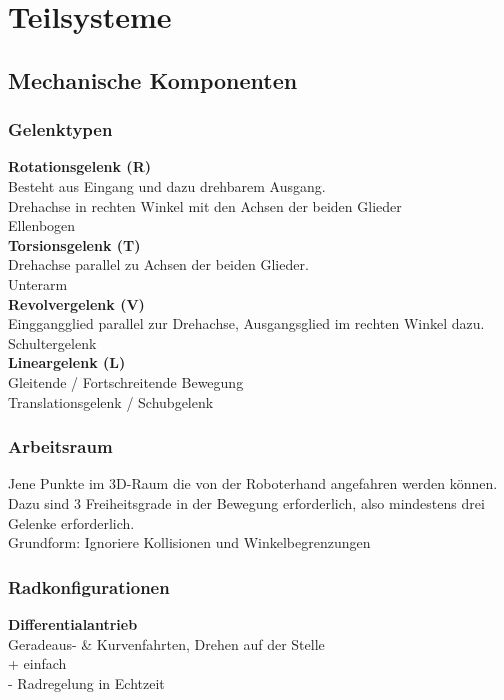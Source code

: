 

\section{Teilsysteme}

\subsection{Mechanische Komponenten}
\subsubsection{Gelenktypen}
\textbf{Rotationsgelenk (R)}\\
Besteht aus Eingang und dazu drehbarem Ausgang.\\
Drehachse in rechten Winkel mit den Achsen der beiden Glieder\\
Ellenbogen\\

\textbf{Torsionsgelenk (T)}\\
Drehachse parallel zu Achsen der beiden Glieder.\\
Unterarm\\

\textbf{Revolvergelenk (V)}\\
Einggangglied parallel zur Drehachse, Ausgangsglied im rechten Winkel dazu.\\
Schultergelenk\\

\textbf{Lineargelenk (L)}\\
Gleitende / Fortschreitende Bewegung\\
Translationsgelenk / Schubgelenk

\subsubsection{Arbeitsraum}
Jene Punkte im 3D-Raum die von der Roboterhand angefahren werden können. Dazu sind 3 Freiheitsgrade in der
Bewegung erforderlich, also mindestens drei Gelenke erforderlich.\\
Grundform: Ignoriere Kollisionen und Winkelbegrenzungen

\subsubsection{Radkonfigurationen}
\textbf{Differentialantrieb}\\
Geradeaus- \& Kurvenfahrten, Drehen auf der Stelle\\
+ einfach\\
- Radregelung in Echtzeit\\

